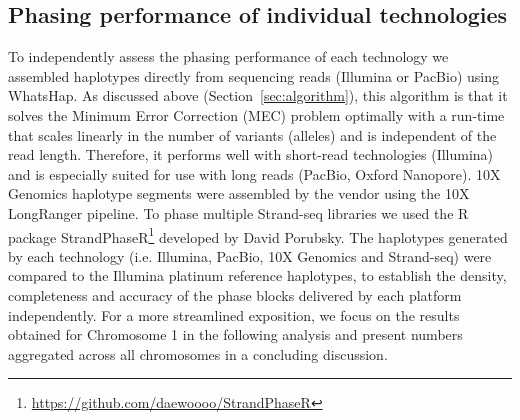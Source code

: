 \subsection{Phasing performance of individual technologies}
	To independently assess the phasing performance of each technology we assembled haplotypes directly from sequencing reads (Illumina or PacBio) using WhatsHap. 
	As discussed above (Section~\ref{sec:algorithm}), this algorithm is that it solves the Minimum Error Correction (MEC) problem optimally with a run-time that scales linearly in the number of variants (alleles) and is independent of the read length. 
	Therefore, it performs well with short-read technologies (Illumina) and is especially suited for use with long reads (PacBio, Oxford Nanopore). 10X Genomics haplotype segments were assembled by the vendor using the 10X LongRanger pipeline. 
	To phase multiple Strand-seq libraries we used the R package StrandPhaseR\footnote{\url{https://github.com/daewoooo/StrandPhaseR}} developed by David Porubsky.
	The haplotypes generated by each technology (i.e. Illumina, PacBio, 10X Genomics and Strand-seq) were compared to the Illumina platinum reference haplotypes, to establish the density, completeness and accuracy of the phase blocks delivered by each platform independently. 
	For a more streamlined exposition, we focus on the results obtained for Chromosome 1 in the following analysis and present numbers aggregated across all chromosomes in a concluding discussion.	
	
